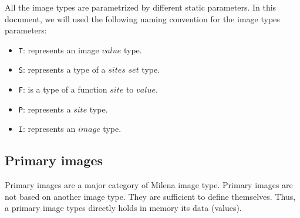 All the image types are parametrized by different static parameters.
In this document, we will used the following naming convention for the
image types parameters:
\begin{itemize}
\item{\verb+T+:} represents an image $value$ type.
\item{\verb+S+:} represents a type of a $sites$ $set$ type.
\item{\verb+F+:} is a type of a function $site$ to $value$.
\item{\verb+P+:} represents a $site$ type.
\item{\verb+I+:} represents an $image$ type.
\end{itemize}

\subsection{Primary images}


Primary images are a major category of Milena image type.
Primary images are not based on another image type.
They are sufficient to define themselves.
Thus, a primary image types directly holds in memory its data (values).


